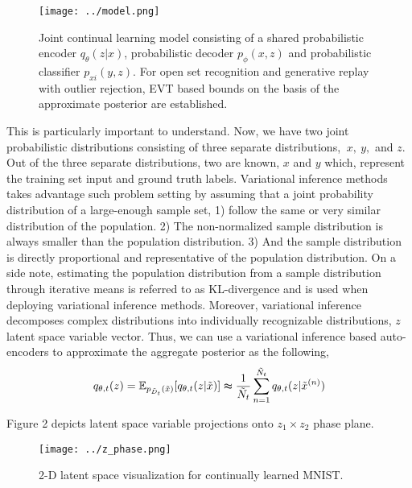 \documentclass[12pt]{article}
\begin{document}
\begin{figure}[h]
  \centering
  \texttt{[image: ../model.png]}
  \caption{Joint continual learning model consisting of a
  shared probabilistic encoder $q_{\theta} (z|x)$, probabilistic decoder
  $p_{\phi} (x, z)$ and probabilistic classifier $p_{xi} (y, z)$. For open set
  recognition and generative replay with outlier rejection, EVT
  based bounds on the basis of the approximate posterior are
  established.}
\end{figure}




This is particularly important to understand. Now, we have two joint probabilistic distributions consisting of three separate distributions, $~x,~y,$ and $z$. Out of the three separate distributions, two are known, $x$ and $y$ which, represent the training set input and ground truth labels. Variational inference methods takes advantage such problem setting by assuming that a joint probability
distribution of a large-enough sample set, 1) follow the same or very similar distribution of the population. 2) The non-normalized sample distribution is always smaller than the population distribution. 3) And the sample distribution is directly proportional and representative of the population distribution. On a side note, estimating the population distribution from a sample distribution through iterative means is referred to as KL-divergence and is used when deploying variational inference methods. Moreover, variational inference decomposes complex distributions into individually recognizable distributions, $z$ latent space variable vector. Thus, we can use a variational inference based auto-encoders to approximate the aggregate posterior as the following, \\
\begin{equation}
q_{\theta, t}(z) = \mathbb{E}_{p_{\tilde{D}_t} (\tilde{x})} [q_{\theta, t}(z|\tilde{x})] \\
\thickapprox \frac{1}{\tilde{N}_{t}}\sum_{n = 1}^{\tilde{N}_{t}} q_{\theta, t} (z|\tilde{x}^{(n)})
\end{equation}

Figure 2 depicts latent space variable projections onto $z_1 \times z_2$ phase plane.

\begin{figure}[h]
  \centering
  \texttt{[image: ../z\_phase.png]}
  \caption{2-D latent space visualization for continually learned MNIST.}
\end{figure}
\end{document}
